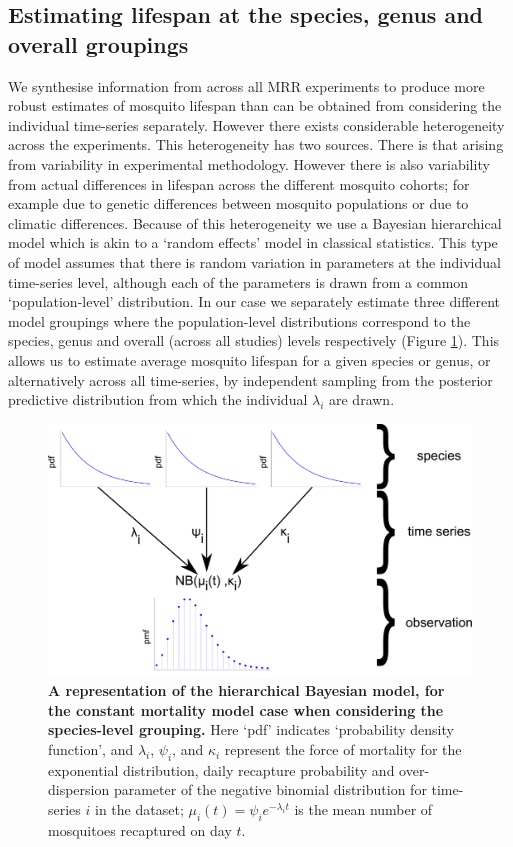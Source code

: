 \documentclass[12pt]{article}
\begin{document}
\subsection{Estimating lifespan at the species, genus and overall groupings}\label{sec:MRR_hierarchical}
We synthesise information from across all MRR experiments to produce more robust estimates of mosquito lifespan than can be obtained from considering the individual time-series separately. However there exists considerable heterogeneity across the experiments. This heterogeneity has two sources. There is that arising from variability in experimental methodology. However there is also variability from actual differences in lifespan across the different mosquito cohorts; for example due to genetic differences between mosquito populations or due to climatic differences. Because of this heterogeneity we use a Bayesian hierarchical model which is akin to a `random effects' model in classical statistics. This type of model assumes that there is random variation in parameters at the individual time-series level, although each of the parameters is drawn from a common `population-level' distribution. In our case we separately estimate three different model groupings where the population-level distributions correspond to the species, genus and overall (across all studies) levels respectively (Figure \ref{fig:mrr_methodDiagramHierarchy}). This allows us to estimate average mosquito lifespan for a given species or genus, or alternatively across all time-series, by independent sampling from the posterior predictive distribution from which the individual $\lambda_i$ are drawn.


\begin{figure}[h]
	\centerline{\includegraphics[width=1\textwidth]{./Figure_files/mrr_methodDiagramHierarchy.pdf}}
	\caption{\textbf{A representation of the hierarchical Bayesian model, for the constant mortality model case when considering the species-level grouping.} Here `pdf' indicates `probability density function', and $\lambda_i$, $\psi_i$, and $\kappa_i$ represent the force of mortality for the exponential distribution, daily recapture probability and over-dispersion parameter of the negative binomial distribution for time-series $i$ in the dataset; $\mu_i(t)= \psi_i e^{-\lambda_i t}$ is the mean number of mosquitoes recaptured on day $t$.}
	\label{fig:mrr_methodDiagramHierarchy}
\end{figure}
\end{document}
